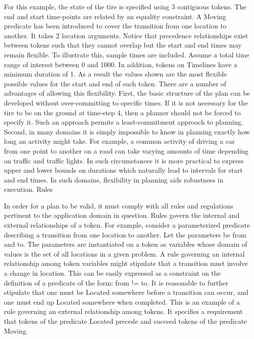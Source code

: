 For this example, the state of the tire is specified using 3
contiguous tokens. The end and start time-points are related by an
equality constraint. A Moving predicate has been introduced to cover
the transition from one location to another. It takes 2 location
arguments. Notice that precedence relationships exist between tokens
such that they cannot overlap but the start and end times may remain
flexible. To illustrate this, sample times are included. Assume a
total time range of interest between 0 and 1000. In addition, tokens
on Timelines have a minimum duration of 1. As a result the values
shown are the most flexible possible values for the start and end of
each token. There are a number of advantages of allowing this
flexibility. First, the basic structure of the plan can be developed
without over-committing to specific times. If it is not necessary for
the tire to be on the ground at time-step 4, then a planner should not
be forced to specify it. Such an approach permits a least-commitment
approach to planning. Second, in many domains it is simply impossible
to know in planning exactly how long an activity might take. For
example, a common activity of driving a car from one point to another
on a road can take varying amounts of time depending on traffic and
traffic lights. In such circumstances it is more practical to express
upper and lower bounds on durations which naturally lead to intervals
for start and end times. In such domains, flexibility in planning aids
robustness in execution.  Rules

In order for a plan to be valid, it must comply with all rules and
regulations pertinent to the application domain in question. Rules
govern the internal and external relationships of a token. For
example, consider a parameterized predicate describing a transition
from one location to another. Let the parameters be from and to. The
parameters are instantiated on a token as variables whose domain of
values is the set of all locations in a given problem. A rule
governing an internal relationship among token variables might
stipulate that a transition must involve a change in location. This
can be easily expressed as a constraint on the definition of a
predicate of the form: from != to. It is reasonable to further
stipulate that one must be Located somewhere before a transition can
occur, and one must end up Located somewhere when completed. This is
an example of a rule governing an external relationship among
tokens. It specifies a requirement that tokens of the predicate
Located precede and succeed tokens of the predicate Moving.

